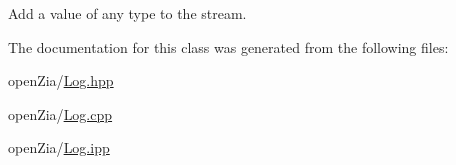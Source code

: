 Add a value of any type to the stream. 



The documentation for this class was generated from the following files\+:\begin{DoxyCompactItemize}
\item 
open\+Zia/\mbox{\hyperlink{_log_8hpp}{Log.\+hpp}}\item 
open\+Zia/\mbox{\hyperlink{_log_8cpp}{Log.\+cpp}}\item 
open\+Zia/\mbox{\hyperlink{_log_8ipp}{Log.\+ipp}}\end{DoxyCompactItemize}
